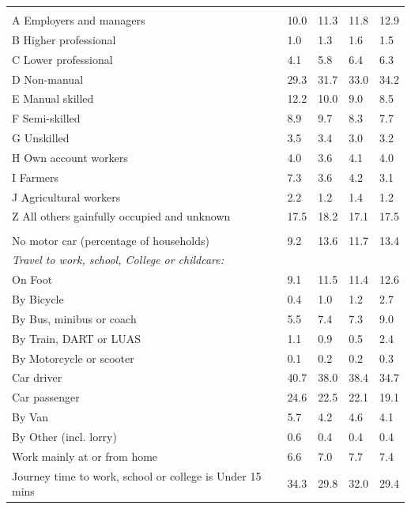 \documentclass{article}
\begin{document}
\begin{table}[h]
\begin{tabular}{KTTTT}
\hline
    \\ 
    \hline
A Employers and managers & 10.0& 11.3& 11.8& 12.9\\
B Higher professional & 1.0& 1.3& 1.6& 1.5\\
C Lower professional & 4.1& 5.8& 6.4& 6.3\\
D Non-manual & 29.3& 31.7& 33.0& 34.2\\
E Manual skilled & 12.2& 10.0&  9.0&  8.5\\
F Semi-skilled & 8.9& 9.7& 8.3& 7.7\\
G Unskilled & 3.5& 3.4& 3.0& 3.2\\
H Own account workers & 4.0& 3.6& 4.1& 4.0\\
I Farmers & 7.3& 3.6& 4.2& 3.1\\
J Agricultural workers & 2.2& 1.2& 1.4& 1.2\\
Z All others gainfully occupied and unknown & 17.5& 18.2& 17.1& 17.5\\
\hline
{}\hline
    \\ 
    \hline
No motor car (percentage of households) &  9.2& 13.6& 11.7& 
13.4\\
    \hline 
\emph{Travel to work, school, College or childcare:} & & & \\
\quad On Foot &  9.1& 11.5& 11.4& 12.6\\ 
\quad By Bicycle & 0.4& 1.0& 1.2& 2.7\\ 
\quad By Bus, minibus or coach & 5.5& 7.4& 7.3& 9.0\\
\quad By Train, DART or LUAS & 1.1& 0.9& 0.5& 2.4\\
\quad By Motorcycle or scooter & 0.1& 0.2& 0.2& 0.3\\
\quad Car driver & 40.7 & 38.0& 38.4& 34.7\\
\quad Car passenger & 24.6& 22.5& 22.1& 19.1\\
\quad By Van & 5.7& 4.2& 4.6& 4.1\\
\quad By Other (incl. lorry) & 0.6& 0.4& 0.4& 0.4\\
    \hline
Work mainly at or from home & 6.6& 7.0& 7.7& 7.4\\
Journey time to work, school or college is Under 15 mins & 34.3& 29.8& 32.0& 29.4\\

\end{tabular}
\end{table}
\end{document}
